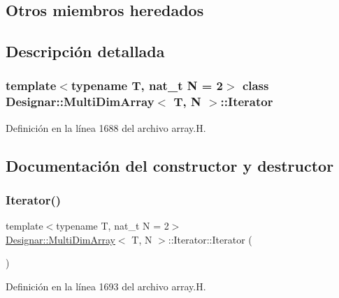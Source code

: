 \subsection*{Otros miembros heredados}


\subsection{Descripción detallada}
\subsubsection*{template$<$typename T, nat\+\_\+t N = 2$>$\newline
class Designar\+::\+Multi\+Dim\+Array$<$ T, N $>$\+::\+Iterator}



Definición en la línea 1688 del archivo array.\+H.



\subsection{Documentación del constructor y destructor}
\mbox{\label{class_designar_1_1_multi_dim_array_1_1_iterator_af627beb86cf5b1154f421078082b18f9}} 
\subsubsection{\texorpdfstring{Iterator()}{Iterator()}\hspace{0.1cm}{\footnotesize\ttfamily [1/5]}}
{\footnotesize\ttfamily template$<$typename T, nat\+\_\+t N = 2$>$ \\
\hyperlink{class_designar_1_1_multi_dim_array}{Designar\+::\+Multi\+Dim\+Array}$<$ T, N $>$\+::Iterator\+::\+Iterator (\begin{DoxyParamCaption}{ }\end{DoxyParamCaption})\hspace{0.3cm}{\ttfamily [inline]}}



Definición en la línea 1693 del archivo array.\+H.

\mbox{\label{class_designar_1_1_multi_dim_array_1_1_iterator_a0b4865a27a5f64866d63376f24076b9f}} 
